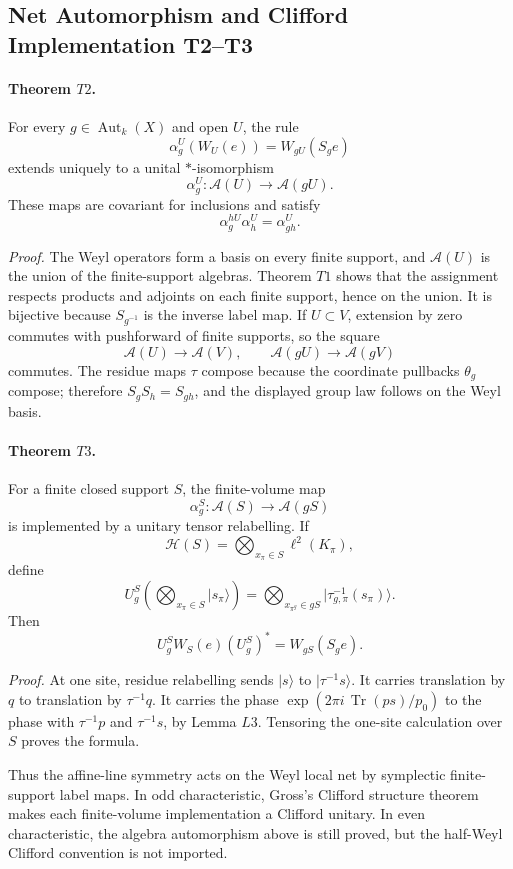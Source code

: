 \subsection{Net Automorphism and Clifford Implementation T2--T3}

\paragraph{Theorem \(T2\).}
For every \(g\in\operatorname{Aut}_k(X)\) and open \(U\), the rule
\[
  \alpha_g^U(W_U(e))=W_{gU}(S_ge)
\]
extends uniquely to a unital \(*\)-isomorphism
\[
  \alpha_g^U:\mathcal A(U)\longrightarrow\mathcal A(gU).
\]
These maps are covariant for inclusions and satisfy
\[
  \alpha_g^{hU}\alpha_h^U=\alpha_{gh}^U.
\]

\emph{Proof.}
The Weyl operators form a basis on every finite support, and
\(\mathcal A(U)\) is the union of the finite-support algebras.  Theorem \(T1\)
shows that the assignment respects products and adjoints on each finite
support, hence on the union.  It is bijective because \(S_{g^{-1}}\) is the
inverse label map.  If \(U\subset V\), extension by zero commutes with
pushforward of finite supports, so the square
\[
  \mathcal A(U)\to\mathcal A(V),\qquad
  \mathcal A(gU)\to\mathcal A(gV)
\]
commutes.  The residue maps \(\tau\) compose because the coordinate pullbacks
\(\theta_g\) compose; therefore \(S_gS_h=S_{gh}\), and the displayed group law
follows on the Weyl basis.

\paragraph{Theorem \(T3\).}
For a finite closed support \(S\), the finite-volume map
\[
  \alpha_g^S:\mathcal A(S)\to\mathcal A(gS)
\]
is implemented by a unitary tensor relabelling.  If
\[
  \mathcal H(S)=\bigotimes_{x_\pi\in S}\ell^2(K_\pi),
\]
define
\[
  U_g^S\left(\bigotimes_{x_\pi\in S}|s_\pi\rangle\right)
  =
  \bigotimes_{x_{\pi^g}\in gS}
  |\tau_{g,\pi}^{-1}(s_\pi)\rangle .
\]
Then
\[
  U_g^S W_S(e)(U_g^S)^*=W_{gS}(S_ge).
\]

\emph{Proof.}
At one site, residue relabelling sends
\(|s\rangle\) to \(|\tau^{-1}s\rangle\).  It carries translation by \(q\) to
translation by \(\tau^{-1}q\).  It carries the phase
\(\exp(2\pi i\,\operatorname{Tr}(ps)/p_0)\) to the phase with
\(\tau^{-1}p\) and \(\tau^{-1}s\), by Lemma \(L3\).  Tensoring the one-site
calculation over \(S\) proves the formula.

Thus the affine-line symmetry acts on the Weyl local net by symplectic
finite-support label maps.  In odd characteristic, Gross's Clifford structure
theorem makes each finite-volume implementation a Clifford unitary.  In even
characteristic, the algebra automorphism above is still proved, but the
half-Weyl Clifford convention is not imported.
